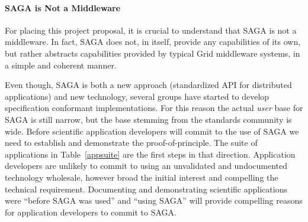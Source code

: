 \documentclass[10pt,letterpaper]{article}
\begin{document}
\paragraph*{SAGA is Not a Middleware} 

For placing this project proposal, it is crucial to understand that
SAGA is not a middleware.  In fact, SAGA does not, in itself, provide
any capabilities of its own, but rather abstracts capabilities
provided by typical Grid middleware systems, in a simple and coherent
manner.



 Even though, SAGA is both a
new approach (standardized API for distributed applications) and new
technology, several groups have started to develop specification
conformant implementations.  For this reason the actual {\em user}
base for SAGA is still narrow, but the base stemming from the
standards community is wide.  Before scientific application developers
will commit to the use of SAGA we need to establish and demonstrate
the proof-of-principle.  The suite of applications in Table~\ref{appsuite} are
the first steps in that direction.  Application developers are
unlikely to commit to using an unvalidated and undocumented technology
wholesale, however broad the initial interest and compelling the
technical requirement.  Documenting and demonstrating scientific
applications were ``before SAGA was used'' and ``using SAGA'' will
provide compelling reasons for application developers to commit to
SAGA.  
\end{document}
